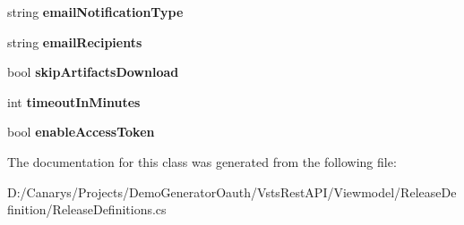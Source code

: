 \begin{DoxyCompactItemize}
\item 
\mbox{\label{class_vsts_rest_a_p_i_1_1_viewmodel_1_1_release_definition_1_1_release_definitions_1_1_environment_options_a9e0f47f36324a349ee4bdcb5c647dfb7}} 
string {\bfseries email\+Notification\+Type}
\item 
\mbox{\label{class_vsts_rest_a_p_i_1_1_viewmodel_1_1_release_definition_1_1_release_definitions_1_1_environment_options_af19b886d3ffae54ce2cd2a00059231d7}} 
string {\bfseries email\+Recipients}
\item 
\mbox{\label{class_vsts_rest_a_p_i_1_1_viewmodel_1_1_release_definition_1_1_release_definitions_1_1_environment_options_a33f39159b65af3def9ddf6c98498166e}} 
bool {\bfseries skip\+Artifacts\+Download}
\item 
\mbox{\label{class_vsts_rest_a_p_i_1_1_viewmodel_1_1_release_definition_1_1_release_definitions_1_1_environment_options_aad921923c20389b597a5eeda6f7aa57f}} 
int {\bfseries timeout\+In\+Minutes}
\item 
\mbox{\label{class_vsts_rest_a_p_i_1_1_viewmodel_1_1_release_definition_1_1_release_definitions_1_1_environment_options_a9b956cd5ea1caeb8e02b0d709aa633a6}} 
bool {\bfseries enable\+Access\+Token}
\end{DoxyCompactItemize}


The documentation for this class was generated from the following file\+:\begin{DoxyCompactItemize}
\item 
D\+:/\+Canarys/\+Projects/\+Demo\+Generator\+Oauth/\+Vsts\+Rest\+A\+P\+I/\+Viewmodel/\+Release\+Definition/Release\+Definitions.\+cs\end{DoxyCompactItemize}
